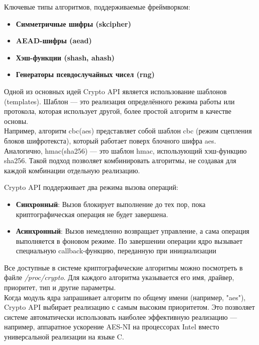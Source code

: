Ключевые типы алгоритмов, поддерживаемые фреймворком:
\begin{itemize}
    \item \textbf{Симметричные шифры (skcipher)}
    \item \textbf{AEAD-шифры (aead)}
    \item \textbf{Хэш-функции (shash, ahash)}
    \item \textbf{Генераторы псевдослучайных чисел (rng)}
\end{itemize}

Одной из основных идей Crypto API является использование шаблонов (templates).
Шаблон — это реализация определённого режима работы или протокола, которая использует другой, более простой алгоритм в качестве основы. \\

Например, алгоритм cbc(aes) представляет собой шаблон cbc (режим сцепления блоков шифротекста), который работает поверх блочного шифра aes. \\

Аналогично, hmac(sha256) — это шаблон hmac, использующий хэш-функцию sha256. Такой подход позволяет комбинировать алгоритмы, не создавая для каждой комбинации отдельную реализацию.

Crypto API поддерживает два режима вызова операций:
\begin{itemize}
    \item \textbf{Синхронный}:
    Вызов блокирует выполнение до тех пор, пока криптографическая операция не будет завершена.
    \item \textbf{Асинхронный}:
    Вызов немедленно возвращает управление, а сама операция выполняется в фоновом режиме.
    По завершении операции ядро вызывает специальную callback-функцию, переданную при инициализации
\end{itemize}

Все доступные в системе криптографические алгоритмы можно посмотреть в файле \textit{/proc/crypto}.
Для каждого алгоритма указывается его имя, драйвер, приоритет, тип и другие параметры.\\



Когда модуль ядра запрашивает алгоритм по общему имени (например, "aes"), Crypto API выбирает реализацию с самым высоким приоритетом.
Это позволяет системе автоматически использовать наиболее эффективную реализацию — например, аппаратное ускорение AES-NI на процессорах Intel вместо универсальной реализации на языке C.\\

